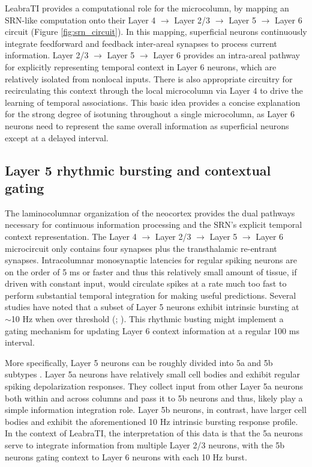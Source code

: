 \documentclass[dwyatte_dissertation.tex]{subfiles}
\begin{document}
LeabraTI provides a computational role for the microcolumn, by mapping an SRN-like computation onto their Layer 4 $\rightarrow$ Layer 2/3 $\rightarrow$ Layer 5 $\rightarrow$ Layer 6 circuit (Figure \ref{fig:srn_circuit}). In this mapping, superficial neurons continuously integrate feedforward and feedback inter-areal synapses to process current information. Layer 2/3 $\rightarrow$ Layer 5 $\rightarrow$ Layer 6 provides an intra-areal pathway for explicitly representing temporal context in Layer 6 neurons, which are relatively isolated from nonlocal inputs. There is also appropriate circuitry for recirculating this context through the local microcolumn via Layer 4 to drive the learning of temporal associations. This basic idea provides a concise explanation for the strong degree of isotuning throughout a single microcolumn, as Layer 6 neurons need to represent the same overall information as superficial neurons except at a delayed interval.

\subsection{Layer 5 rhythmic bursting and contextual gating}
The laminocolumnar organization of the neocortex provides the dual pathways necessary for continuous information processing and the SRN's explicit temporal context representation. The Layer 4 $\rightarrow$ Layer 2/3 $\rightarrow$ Layer 5 $\rightarrow$ Layer 6 microcircuit only contains four synapses plus the transthalamic re-entrant synapses. Intracolumnar monosynaptic latencies for regular spiking neurons are on the order of 5 ms or faster \cite{Armstrong-JamesFoxDas-Gupta92,LumerEdelmanTononi97} and thus this relatively small amount of tissue, if driven with constant input, would circulate spikes at a rate much too fast to perform substantial temporal integration for making useful predictions. Several studies have noted that a subset of Layer 5 neurons exhibit intrinsic bursting at $\sim$10 Hz when over threshold (; ). This rhythmic busting might implement a gating mechanism for updating Layer 6 context information at a regular 100 ms interval.

More specifically, Layer 5 neurons can be roughly divided into 5a and 5b subtypes \cite{ThomsonLamy07}. Layer 5a neurons have relatively small cell bodies and exhibit regular spiking depolarization responses. They collect input from other Layer 5a neurons both within and across columns \cite{SchubertKotterStaiger07} and pass it to 5b neurons and thus, likely play a simple information integration role. Layer 5b neurons, in contrast, have larger cell bodies and exhibit the aforementioned 10 Hz intrinsic bursting response profile. In the context of LeabraTI, the interpretation of this data is that the 5a neurons serve to integrate information from multiple Layer 2/3 neurons, with the 5b neurons gating context to Layer 6 neurons with each 10 Hz burst.
\end{document}

